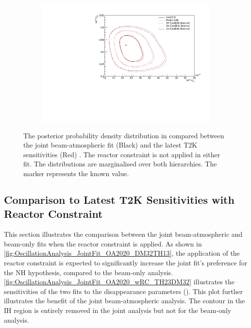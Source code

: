 \begin{figure}[h]
  \begin{subfigure}[t]{0.91\textwidth}
    \includegraphics[width=\textwidth, trim={0mm 0mm 0mm 0mm}, clip,page=1]{Figures/OA/JointFit_OA2020_Comp/ContourComparison_2D_th13_th23_BH_1_woRC_UnSmeared_CredibleInterval.pdf}
  \end{subfigure}
  \caption{The posterior probability density distribution in  compared between the joint beam-atmospheric fit (Black) and the latest T2K sensitivities (Red) \cite{Dunne2020-uf, t2k_tn_393}. The reactor constraint is not applied in either fit. The distributions are marginalised over both hierarchies. The marker represents the known value.}
  \label{fig:OscillationAnalysis_JointFit_OA2020_TH13TH23}
\end{figure}

\clearpage
\subsection{Comparison to Latest T2K Sensitivities with Reactor Constraint}
\label{sec:OscillationAnalysis_JointFit_OA2020_wRC}
This section illustrates the comparison between the joint beam-atmospheric and beam-only fits when the reactor constraint is applied. As shown in \autoref{fig:OscillationAnalysis_JointFit_OA2020_DM32TH13}, the application of the reactor constraint is expected to significantly increase the joint fit's preference for the NH hypothesis, compared to the beam-only analysis. \autoref{fig:OscillationAnalysis_JointFit_OA2020_wRC_TH23DM32} illustrates the sensitivities of the two fits to the disappearance parameters ().
This plot further illustrates the benefit of the joint beam-atmospheric analysis.
The \quickmath{1\sigma} contour in the IH region is entirely removed in the joint analysis but not for the beam-only analysis.

